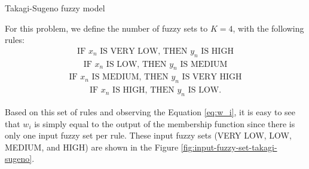 \documentclass[english]{sobraep}
\begin{document}
\begin{algorithm}[!ht]
    \DontPrintSemicolon
      
    
    \caption{Takagi-Sugeno fuzzy model}
    \label{alg:takagi-sugeno-fuzzy}
\end{algorithm}

For this problem, we define the number of fuzzy sets to \(K=4\), with the following rules:
\begin{align}
    \text{IF } x_n \text{ IS VERY LOW, THEN } y_n \text{ IS HIGH} \nonumber
\end{align}
\begin{align}
    \text{IF } x_n \text{ IS LOW, THEN } y_n \text{ IS MEDIUM} \nonumber
\end{align}
\begin{align}
    \text{IF } x_n \text{ IS MEDIUM, THEN } y_n \text{ IS VERY HIGH} \nonumber
\end{align}
\begin{align}
    \text{IF } x_n \text{ IS HIGH, THEN } y_n \text{ IS LOW}. \nonumber
\end{align}

Based on this set of rules and observing the Equation \eqref{eq:w_i}, it is easy to see that \(w_i\) is simply equal to the output of the membership function since there is only one input fuzzy set per rule. These input fuzzy sets (VERY LOW, LOW, MEDIUM, and HIGH) are shown in the Figure \ref{fig:input-fuzzy-set-takagi-sugeno}.
\end{document}

